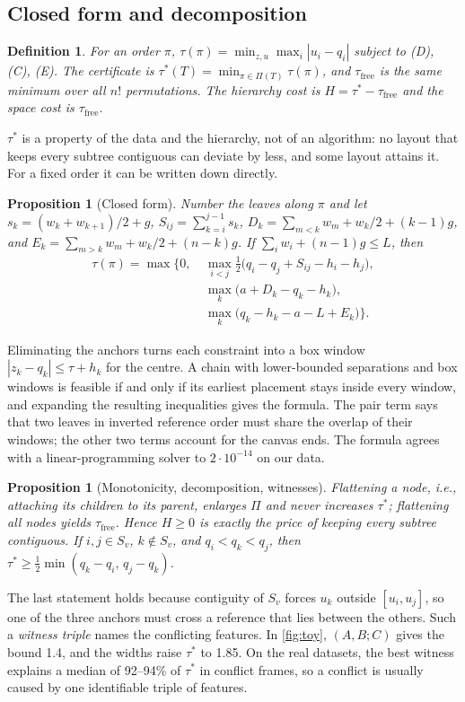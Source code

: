 \documentclass[review]{vgtc}                 %
\newtheorem{proposition}[theorem]{Proposition}
\newtheorem{definition}[theorem]{Definition}
\newcommand{\free}{\mathrm{free}}
\begin{document}
\subsection{Closed form and decomposition}

\begin{definition}
For an order $\pi$, $\tau(\pi)=\min_{z,u}\max_i|u_i-q_i|$ subject to (D), (C), (E). The \emph{certificate} is $\tau^*(T)=\min_{\pi\in\Pi(T)}\tau(\pi)$, and $\tau_\free$ is the same minimum over all $n!$ permutations. The \emph{hierarchy cost} is $H=\tau^*-\tau_\free$ and the \emph{space cost} is $\tau_\free$.
\end{definition}

$\tau^*$ is a property of the data and the hierarchy, not of an algorithm: no layout that keeps every subtree contiguous can deviate by less, and some layout attains it. For a fixed order it can be written down directly.

\begin{proposition}[Closed form]\label{prop:closed}
Number the leaves along $\pi$ and let $s_k=(w_k+w_{k+1})/2+g$, $S_{ij}=\sum_{k=i}^{j-1}s_k$, $D_k=\sum_{m<k}w_m+w_k/2+(k-1)g$, and $E_k=\sum_{m>k}w_m+w_k/2+(n-k)g$. If $\sum_iw_i+(n-1)g\le L$, then
\begin{align*}
\tau(\pi)=\max\Big\{0,\ &\max_{i<j}\tfrac12\big(q_i-q_j+S_{ij}-h_i-h_j\big),\\
&\max_k\big(a+D_k-q_k-h_k\big),\\
&\max_k\big(q_k-h_k-a-L+E_k\big)\Big\}.
\end{align*}
\end{proposition}
Eliminating the anchors turns each constraint into a box window $|z_k-q_k|\le\tau+h_k$ for the centre. A chain with lower-bounded separations and box windows is feasible if and only if its earliest placement stays inside every window, and expanding the resulting inequalities gives the formula. The pair term says that two leaves in inverted reference order must share the overlap of their windows; the other two terms account for the canvas ends. The formula agrees with a linear-programming solver to $2\cdot10^{-14}$ on our data.

\begin{proposition}[Monotonicity, decomposition, witnesses]\label{prop:mono}
Flattening a node, i.e., attaching its children to its parent, enlarges $\Pi$ and never increases $\tau^*$; flattening all nodes yields $\tau_\free$. Hence $H\ge0$ is exactly the price of keeping every subtree contiguous. If $i,j\in S_v$, $k\notin S_v$, and $q_i<q_k<q_j$, then $\tau^*\ge\frac12\min(q_k-q_i,\,q_j-q_k)$.
\end{proposition}
The last statement holds because contiguity of $S_v$ forces $u_k$ outside $[u_i,u_j]$, so one of the three anchors must cross a reference that lies between the others. Such a \emph{witness triple} names the conflicting features. In \cref{fig:toy}, $(A,B;C)$ gives the bound 1.4, and the widths raise $\tau^*$ to 1.85. On the real datasets, the best witness explains a median of 92--94\% of $\tau^*$ in conflict frames, so a conflict is usually caused by one identifiable triple of features.
\end{document}
